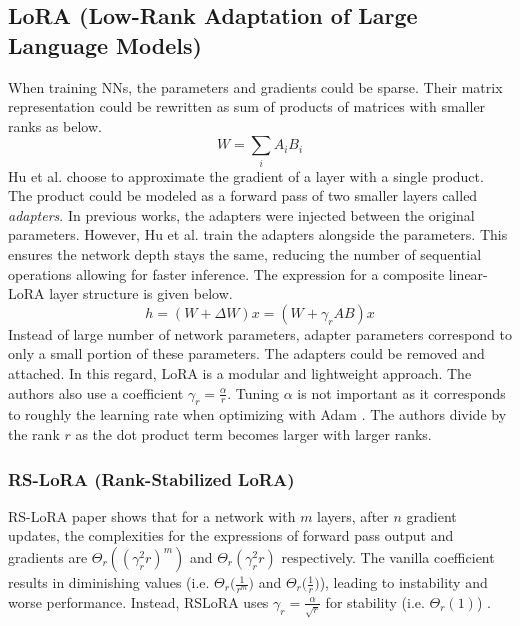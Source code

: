 \documentclass{article}
\begin{document}
\subsection{LoRA (Low-Rank Adaptation of Large Language Models)}\label{lora}
When training NNs, the parameters and gradients could be sparse. Their matrix representation could be rewritten as sum of products of matrices with smaller ranks as below.
\begin{equation}
    W = \sum_i A_iB_i
\end{equation}
Hu et al. choose to approximate the gradient of a layer with a single product. The product could be modeled as a forward pass of two smaller layers called \textit{adapters}. In previous works, the adapters were injected between the original parameters. However, Hu et al. train the adapters alongside the parameters. This ensures the network depth stays the same, reducing the number of sequential operations allowing for faster inference. The expression for a composite linear-LoRA layer structure is given below.
\begin{equation}
    h = (W + \Delta W)x = (W + \gamma_rAB)x
\end{equation}
Instead of large number of network parameters, adapter parameters correspond to only a small portion of these parameters. The adapters could be removed and attached. In this regard, LoRA is a modular and lightweight approach. The authors also use a coefficient $\gamma_r=\frac{\alpha}{r}$. Tuning $\alpha$ is not important as it corresponds to roughly the learning rate when optimizing with Adam \cite{hu_lora_2021}. The authors divide by the rank $r$ as the dot product term becomes larger with larger ranks.
\subsubsection{RS-LoRA (Rank-Stabilized LoRA)}
RS-LoRA paper shows that for a network with $m$ layers, after $n$ gradient updates, the complexities for the expressions of forward pass output and gradients are $\Theta_r((\gamma^2_rr)^m)$ and $\Theta_r(\gamma^2_rr)$ respectively. The vanilla coefficient results in diminishing values (i.e. $\Theta_r\big(\frac{1}{r^m}\big)$ and $\Theta_r\big(\frac{1}{r}\big)$), leading to instability and worse performance. Instead, RSLoRA uses $\gamma_r = \frac{\alpha}{\sqrt{r}}$ for stability (i.e. $\Theta_r(1)$) \cite{kalajdzievski_rank_2023}.
\end{document}
